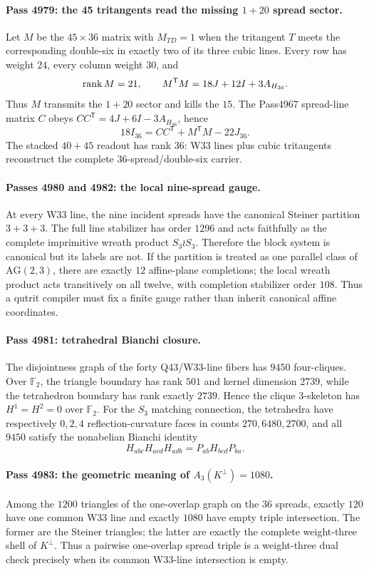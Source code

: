 \paragraph{Pass 4979: the 45 tritangents read the missing $1+20$ spread sector.}
Let $M$ be the $45\times36$ matrix with $M_{TD}=1$ when the tritangent $T$ meets the corresponding
double-six in exactly two of its three cubic lines.  Every row has weight $24$, every column weight
$30$, and
\[
\operatorname{rank} M=21,\qquad M^{\mathsf T}M=18J+12I+3A_{H_{36}}.
\]
Thus $M$ transmits the $1+20$ sector and kills the $15$.  The Pass4967 spread-line matrix $C$ obeys
$CC^{\mathsf T}=4J+6I-3A_{H_{36}}$, hence
\[
\boxed{18I_{36}=CC^{\mathsf T}+M^{\mathsf T}M-22J_{36}} .
\]
The stacked $40+45$ readout has rank $36$: W33 lines plus cubic tritangents reconstruct the complete
36-spread/double-six carrier.

\paragraph{Passes 4980 and 4982: the local nine-spread gauge.}
At every W33 line, the nine incident spreads have the canonical Steiner partition $3+3+3$.  The full
line stabilizer has order $1296$ and acts faithfully as the complete imprimitive wreath product
$S_3\wr S_3$.  Therefore the block system is canonical but its labels are not.  If the partition is
treated as one parallel class of $\mathrm{AG}(2,3)$, there are exactly $12$ affine-plane completions;
the local wreath product acts transitively on all twelve, with completion stabilizer order $108$.
Thus a qutrit compiler must fix a finite gauge rather than inherit canonical affine coordinates.

\paragraph{Pass 4981: tetrahedral Bianchi closure.}
The disjointness graph of the forty Q43/W33-line fibers has $9450$ four-cliques.  Over $\mathbb F_2$,
the triangle boundary has rank $501$ and kernel dimension $2739$, while the tetrahedron boundary has
rank exactly $2739$.  Hence the clique $3$-skeleton has $H^1=H^2=0$ over $\mathbb F_2$.
For the $S_3$ matching connection, the tetrahedra have respectively $0,2,4$ reflection-curvature
faces in counts $270,6480,2700$, and all $9450$ satisfy the nonabelian Bianchi identity
\[
H_{abc}H_{acd}H_{adb}=P_{ab}H_{bcd}P_{ba}.
\]

\paragraph{Pass 4983: the geometric meaning of $A_3(K^\perp)=1080$.}
Among the $1200$ triangles of the one-overlap graph on the 36 spreads, exactly $120$ have one common
W33 line and exactly $1080$ have empty triple intersection.  The former are the Steiner triangles;
the latter are exactly the complete weight-three shell of $K^\perp$.  Thus a pairwise one-overlap
spread triple is a weight-three dual check precisely when its common W33-line intersection is empty.
